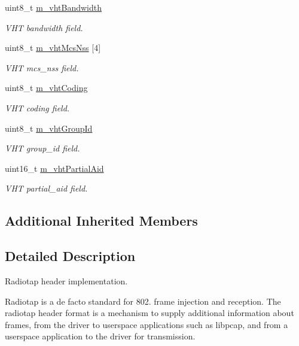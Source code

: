 \begin{DoxyCompactItemize}
uint8\+\_\+t \hyperlink{classns3_1_1RadiotapHeader_a5a21360554e80b96114f79c2e315fffe}{m\+\_\+vht\+Bandwidth}
\begin{DoxyCompactList}\small\item\em V\+HT bandwidth field. \end{DoxyCompactList}\item 
uint8\+\_\+t \hyperlink{classns3_1_1RadiotapHeader_a771386b3e7e6bbc2e44a241ae6cf1797}{m\+\_\+vht\+Mcs\+Nss} \mbox{[}4\mbox{]}
\begin{DoxyCompactList}\small\item\em V\+HT mcs\+\_\+nss field. \end{DoxyCompactList}\item 
uint8\+\_\+t \hyperlink{classns3_1_1RadiotapHeader_a6d4b9a2225cf4343df89a95097baa603}{m\+\_\+vht\+Coding}
\begin{DoxyCompactList}\small\item\em V\+HT coding field. \end{DoxyCompactList}\item 
uint8\+\_\+t \hyperlink{classns3_1_1RadiotapHeader_a17096a7c0cea398b1a80a1789b6fcd6f}{m\+\_\+vht\+Group\+Id}
\begin{DoxyCompactList}\small\item\em V\+HT group\+\_\+id field. \end{DoxyCompactList}\item 
uint16\+\_\+t \hyperlink{classns3_1_1RadiotapHeader_a39d6fde2fceecb55e847f28e89f2ed4d}{m\+\_\+vht\+Partial\+Aid}
\begin{DoxyCompactList}\small\item\em V\+HT partial\+\_\+aid field. \end{DoxyCompactList}\end{DoxyCompactItemize}
\subsection*{Additional Inherited Members}


\subsection{Detailed Description}
Radiotap header implementation. 

Radiotap is a de facto standard for 802. frame injection and reception. The radiotap header format is a mechanism to supply additional information about frames, from the driver to userspace applications such as libpcap, and from a userspace application to the driver for transmission. 

